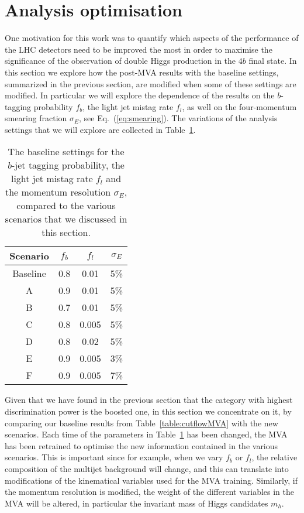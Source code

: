 
\section{Analysis optimisation}
\label{sec:optimisation}

One motivation for this work was to quantify which aspects
of the performance of the LHC detectors need to be improved
the most in order to maximise the significance of the observation
of double Higgs production in the $4b$ final state.
%
In this section we explore how the post-MVA
results with the baseline settings,
summarized in the previous section, are modified when some of
these settings are modified.
%
In particular we will explore the dependence of the results on
the $b$-tagging probability $f_b$, the light jet mistag rate
$f_l$, as well on the four-momentum smearing fraction $\sigma_E$,
see Eq.~(\ref{eq:smearing}).
%
The variations of the analysis
settings that we will explore are collected in
Table~\ref{sec:variations}.

\begin{table}[h]
  \centering
  \begin{tabular}{|c|c|c|c|}
\hline
    Scenario  &  $f_b$  &  $f_l$  &  $\sigma_E$ \\
    \hline
    \hline
    Baseline  &  0.8   &   0.01  &  5\% \\
    \hline
    A        &  0.9   &   0.01  &  5\% \\
    B        &  0.7   &   0.01  &  5\% \\
    C        &  0.8   &   0.005  &  5\% \\
    D        &  0.8   &   0.02  &  5\% \\
    E        &  0.9   &   0.005  &  3\% \\
    F        &  0.9   &   0.005  &  7\% \\   
    \hline
  \end{tabular}
  \caption{\small The baseline settings for the $b$-jet
    tagging probability, the light jet mistag rate $f_l$
    and the momentum resolution $\sigma_E$, compared
    to the various scenarios that we discussed in this section.
\label{sec:variations}
  }
  \end{table}


Given that we have found in the previous section that the
category with highest discrimination power is the boosted one,
in this section we concentrate on it,
by comparing our baseline results from Table~\ref{table:cutflowMVA}
with the new scenarios.
%
Each time of the parameters in Table~\ref{sec:variations}
 has been changed, the MVA has been retrained to optimise the
new information contained in the various scenarios.
%
This is important since for example, when we vary $f_b$
or $f_l$, the relative composition of the multijet
background will change, and this can translate into
modifications of the kinematical variables used for
the MVA training.
%
Similarly, if the momentum resolution is modified,
the weight of the different variables in the MVA
will be altered, in particular the invariant mass
of Higgs candidates $m_h$.


